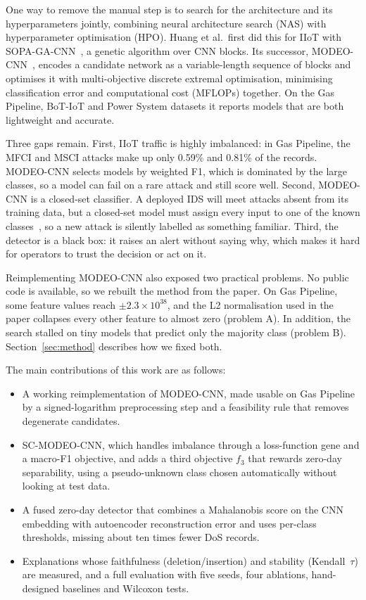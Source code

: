 \documentclass[10pt,twocolumn,letterpaper]{article}
\begin{document}
One way to remove the manual step is to search for the architecture and
its hyperparameters jointly, combining neural architecture search (NAS)
with hyperparameter optimisation (HPO). Huang et al.\ first did this for
IIoT with SOPA-GA-CNN~\cite{huang2023sopa}, a genetic algorithm over CNN
blocks. Its successor, MODEO-CNN~\cite{lu2025modeo}, encodes a candidate
network as a variable-length sequence of blocks and optimises it with
multi-objective discrete extremal optimisation, minimising classification
error and computational cost (MFLOPs) together. On the Gas Pipeline,
BoT-IoT and Power System datasets it reports models that are both
lightweight and accurate.

Three gaps remain. First, IIoT traffic is highly imbalanced: in Gas
Pipeline, the MFCI and MSCI attacks make up only 0.59\% and 0.81\% of the
records. MODEO-CNN selects models by weighted F1, which is dominated by
the large classes, so a model can fail on a rare attack and still score
well. Second, MODEO-CNN is a closed-set classifier. A deployed IDS will
meet attacks absent from its training data, but a closed-set model must
assign every input to one of the known classes~\cite{scheirer2013openset},
so a new attack is silently labelled as something familiar. Third, the
detector is a black box: it raises an alert without saying why, which
makes it hard for operators to trust the decision or act on it.

Reimplementing MODEO-CNN also exposed two practical problems. No public
code is available, so we rebuilt the method from the paper. On Gas
Pipeline, some feature values reach $\pm 2.3\times10^{38}$, and the L2
normalisation used in the paper collapses every other feature to almost
zero (problem A). In addition, the search stalled on tiny models that
predict only the majority class (problem B). Section~\ref{sec:method}
describes how we fixed both.

The main contributions of this work are as follows:
\begin{itemize}
  \item A working reimplementation of MODEO-CNN, made usable on Gas
        Pipeline by a signed-logarithm preprocessing step and a
        feasibility rule that removes degenerate candidates.
  \item SC-MODEO-CNN, which handles imbalance through a loss-function gene
        and a macro-F1 objective, and adds a third objective $f_3$ that
        rewards zero-day separability, using a pseudo-unknown class chosen
        automatically without looking at test data.
  \item A fused zero-day detector that combines a Mahalanobis score on the
        CNN embedding with autoencoder reconstruction error and uses
        per-class thresholds, missing about ten times fewer DoS records.
  \item Explanations whose faithfulness (deletion/insertion) and stability
        (Kendall~$\tau$) are measured, and a full evaluation with five
        seeds, four ablations, hand-designed baselines and Wilcoxon tests.
\end{itemize}
\end{document}
